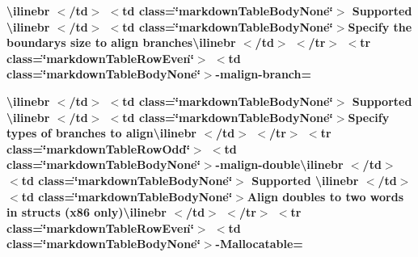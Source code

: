 \begin{longtabu}
{\bfseries{{\ttfamily \textbackslash{}ilinebr \texorpdfstring{$<$}{<}/td\texorpdfstring{$>$}{>} \texorpdfstring{$<$}{<}td class=\char`\"{}markdown\+Table\+Body\+None\char`\"{}\texorpdfstring{$>$}{>} Supported \textbackslash{}ilinebr \texorpdfstring{$<$}{<}/td\texorpdfstring{$>$}{>} \texorpdfstring{$<$}{<}td class=\char`\"{}markdown\+Table\+Body\+None\char`\"{}\texorpdfstring{$>$}{>}}Specify the boundary\textquotesingle{}s size to align branches{\ttfamily \textbackslash{}ilinebr \texorpdfstring{$<$}{<}/td\texorpdfstring{$>$}{>} \texorpdfstring{$<$}{<}/tr\texorpdfstring{$>$}{>} \texorpdfstring{$<$}{<}tr class=\char`\"{}markdown\+Table\+Row\+Even\char`\"{}\texorpdfstring{$>$}{>} \texorpdfstring{$<$}{<}td class=\char`\"{}markdown\+Table\+Body\+None\char`\"{}\texorpdfstring{$>$}{>}}-\/malign-\/branch=}}

{\bfseries{{\ttfamily \textbackslash{}ilinebr \texorpdfstring{$<$}{<}/td\texorpdfstring{$>$}{>} \texorpdfstring{$<$}{<}td class=\char`\"{}markdown\+Table\+Body\+None\char`\"{}\texorpdfstring{$>$}{>} Supported \textbackslash{}ilinebr \texorpdfstring{$<$}{<}/td\texorpdfstring{$>$}{>} \texorpdfstring{$<$}{<}td class=\char`\"{}markdown\+Table\+Body\+None\char`\"{}\texorpdfstring{$>$}{>}}Specify types of branches to align{\ttfamily \textbackslash{}ilinebr \texorpdfstring{$<$}{<}/td\texorpdfstring{$>$}{>} \texorpdfstring{$<$}{<}/tr\texorpdfstring{$>$}{>} \texorpdfstring{$<$}{<}tr class=\char`\"{}markdown\+Table\+Row\+Odd\char`\"{}\texorpdfstring{$>$}{>} \texorpdfstring{$<$}{<}td class=\char`\"{}markdown\+Table\+Body\+None\char`\"{}\texorpdfstring{$>$}{>}}-\/malign-\/double{\ttfamily \textbackslash{}ilinebr \texorpdfstring{$<$}{<}/td\texorpdfstring{$>$}{>} \texorpdfstring{$<$}{<}td class=\char`\"{}markdown\+Table\+Body\+None\char`\"{}\texorpdfstring{$>$}{>} Supported \textbackslash{}ilinebr \texorpdfstring{$<$}{<}/td\texorpdfstring{$>$}{>} \texorpdfstring{$<$}{<}td class=\char`\"{}markdown\+Table\+Body\+None\char`\"{}\texorpdfstring{$>$}{>}}Align doubles to two words in structs (x86 only){\ttfamily \textbackslash{}ilinebr \texorpdfstring{$<$}{<}/td\texorpdfstring{$>$}{>} \texorpdfstring{$<$}{<}/tr\texorpdfstring{$>$}{>} \texorpdfstring{$<$}{<}tr class=\char`\"{}markdown\+Table\+Row\+Even\char`\"{}\texorpdfstring{$>$}{>} \texorpdfstring{$<$}{<}td class=\char`\"{}markdown\+Table\+Body\+None\char`\"{}\texorpdfstring{$>$}{>}}-\/Mallocatable=}}


\end{longtabu}
